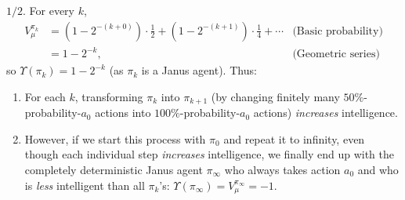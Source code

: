 \documentclass[runningheads]{llncs}
\begin{document}
\begin{example}
    $1/2$.
    For every $k$,
    \begin{align*}
        V^{\pi_k}_\mu
            &= (1-2^{-(k+0)})\cdot \mbox{$\frac12$}
                +(1-2^{-(k+1)})\cdot\mbox{$\frac14$} + \cdots
                    &\mbox{(Basic probability)}\\
            &= 1-2^{-k},
                    &\mbox{(Geometric series)}
    \end{align*}
    so $\Upsilon(\pi_k)=1-2^{-k}$ (as $\pi_k$ is a Janus agent).
    Thus:
    \begin{enumerate}
        \item For each $k$, transforming $\pi_k$ into $\pi_{k+1}$
            (by changing finitely many $50\%$-probability-$a_0$
            actions into $100\%$-probability-$a_0$ actions)
            \emph{increases} intelligence.
        \item However, if we start this process with $\pi_0$ and
            repeat it to infinity, even though each individual step
            \emph{increases} intelligence, we finally end up with
            the completely deterministic
            Janus agent $\pi_{\infty}$ who always takes action $a_0$ and who is
            \emph{less} intelligent than all $\pi_k$'s:
            $\Upsilon(\pi_{\infty})=V^{\pi_\infty}_\mu=-1$.
    \end{enumerate}
\end{example}



\end{document}
